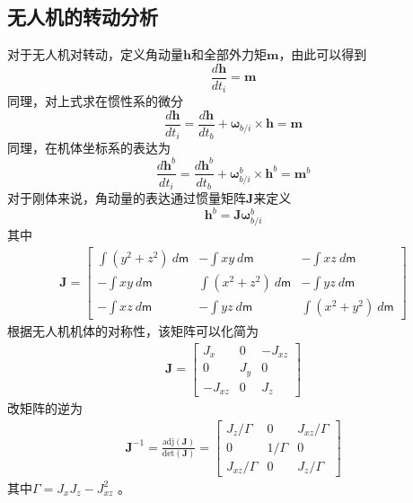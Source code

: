\subsection{无人机的转动分析}
对于无人机对转动，定义角动量$\mathbf{h}$和全部外力矩$\mathbf{m}$，由此可以得到
\begin{equation}
	\frac{ d \mathbf{h}}{d t_i}=\mathbf{m}
\end{equation}
同理，对上式求在惯性系的微分
\begin{equation}
	\frac{ d \mathbf{h}}{d t_i} = \frac{d\mathbf{h}}{dt_b} + \mathbf{\omega}_{b/i} \times \mathbf{h} = \mathbf{m}
\end{equation}
同理，在机体坐标系的表达为
\begin{equation}
	\frac{ d \mathbf{h}^b}{d t_i} = \frac{d\mathbf{h}^b}{dt_b} + \mathbf{\omega}^b_{b/i} \times \mathbf{h}^b = \mathbf{m}^b
\end{equation}
对于刚体来说，角动量的表达通过惯量矩阵$\mathbf{J}$来定义
\begin{equation}
	\mathbf{h}^b=\mathbf{J}  \mathbf{\omega}^b_{b/i}
\end{equation}
其中
\begin{align}
	\mathbf{J} =\begin{bmatrix}	\int(y^2 + z^2)~d\mathsf{m} & -\int xy \ d\mathsf{m}        & -\int xz~d\mathsf{m} \\	-\int xy~d\mathsf{m}        & \int(x^2 + z^2)~d\mathsf{m} & -\int yz~d\mathsf{m} \\	-\int xz~d\mathsf{m}        & -\int yz~d\mathsf{m}  & \int(x^2 + y^2)~d\mathsf{m} \end{bmatrix}
\end{align}
根据无人机机体的对称性，该矩阵可以化简为
\begin{align}
	\mathbf{J} = \begin{bmatrix}	J_x     & 0   & -J_{xz} \\	0       & J_y & 0       \\	-J_{xz} & 0   & J_z  \end{bmatrix}
\end{align}
改矩阵的逆为
\begin{align}
	\mathbf{J}^{-1}=\frac{\mathrm{adj}(\mathbf{J}) }{\mathrm{det}(\mathbf{J}) } = \begin{bmatrix}	J_z / \Gamma     & 0   & J_{xz}/ \Gamma \\	0       & 1/ \Gamma & 0       \\	J_{xz}/ \Gamma & 0   & J_z/ \Gamma \end{bmatrix}
\end{align}
其中$ \Gamma = J_xJ_z - J_{xz}^2$ 。

